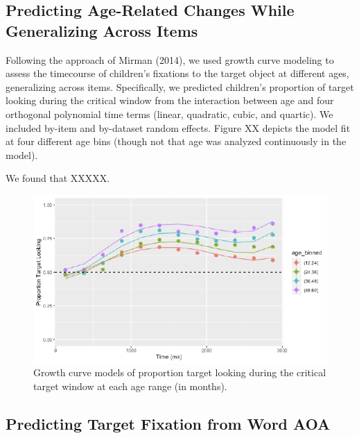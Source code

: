 \documentclass[10pt, letterpaper]{article}
\newenvironment{CodeChunk}{}{}
\begin{document}
\hypertarget{predicting-age-related-changes-while-generalizing-across-items}{%
\subsection{Predicting Age-Related Changes While Generalizing Across
Items}\label{predicting-age-related-changes-while-generalizing-across-items}}

Following the approach of Mirman (2014), we used growth curve modeling
to assess the timecourse of children's fixations to the target object at
different ages, generalizing across items. Specifically, we predicted
children's proportion of target looking during the critical window from
the interaction between age and four orthogonal polynomial time terms
(linear, quadratic, cubic, and quartic). We included by-item and
by-dataset random effects. Figure XX depicts the model fit at four
different age bins (though not that age was analyzed continuously in the
model).

We found that XXXXX.

\begin{CodeChunk}
\begin{figure}[H]

{\centering \includegraphics{figs/age_gca-1} 

}

\caption[Growth curve models of proportion target looking during the critical target window at each age range (in months)]{Growth curve models of proportion target looking during the critical target window at each age range (in months).}\label{fig:age_gca}
\end{figure}
\end{CodeChunk}

\hypertarget{predicting-target-fixation-from-word-aoa}{%
\subsection{Predicting Target Fixation from Word
AOA}\label{predicting-target-fixation-from-word-aoa}}
\end{document}
